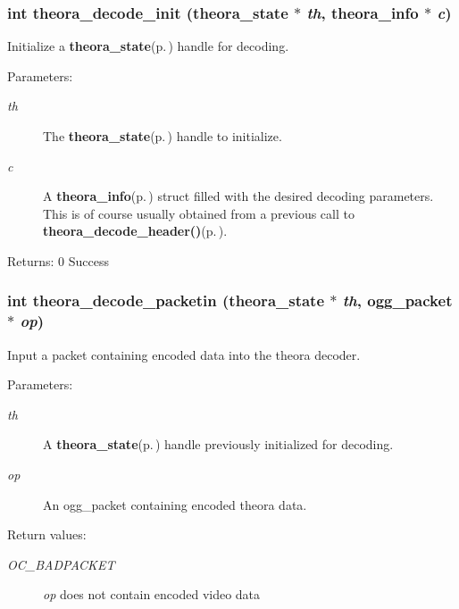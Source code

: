 \subsubsection{\setlength{\rightskip}{0pt plus 5cm}int theora\_\-decode\_\-init ({\bf theora\_\-state} $\ast$ {\em th}, {\bf theora\_\-info} $\ast$ {\em c})}\label{theora_8h_a22}


Initialize a {\bf theora\_\-state}{\rm (p.\,\pageref{structtheora__state})} handle for decoding. 

\begin{Desc}
\item[Parameters:]
\begin{description}
\item[{\em th}]The {\bf theora\_\-state}{\rm (p.\,\pageref{structtheora__state})} handle to initialize. \item[{\em c}]A {\bf theora\_\-info}{\rm (p.\,\pageref{structtheora__info})} struct filled with the desired decoding parameters. This is of course usually obtained from a previous call to {\bf theora\_\-decode\_\-header()}{\rm (p.\,\pageref{theora_8h_a21})}. \end{description}
\end{Desc}
\begin{Desc}
\item[Returns:]0 Success \end{Desc}
\subsubsection{\setlength{\rightskip}{0pt plus 5cm}int theora\_\-decode\_\-packetin ({\bf theora\_\-state} $\ast$ {\em th}, ogg\_\-packet $\ast$ {\em op})}\label{theora_8h_a23}


Input a packet containing encoded data into the theora decoder. 

\begin{Desc}
\item[Parameters:]
\begin{description}
\item[{\em th}]A {\bf theora\_\-state}{\rm (p.\,\pageref{structtheora__state})} handle previously initialized for decoding. \item[{\em op}]An ogg\_\-packet containing encoded theora data. \end{description}
\end{Desc}
\begin{Desc}
\item[Return values:]
\begin{description}
\item[{\em OC\_\-BADPACKET}]{\em op\/} does not contain encoded video data \end{description}
\end{Desc}
